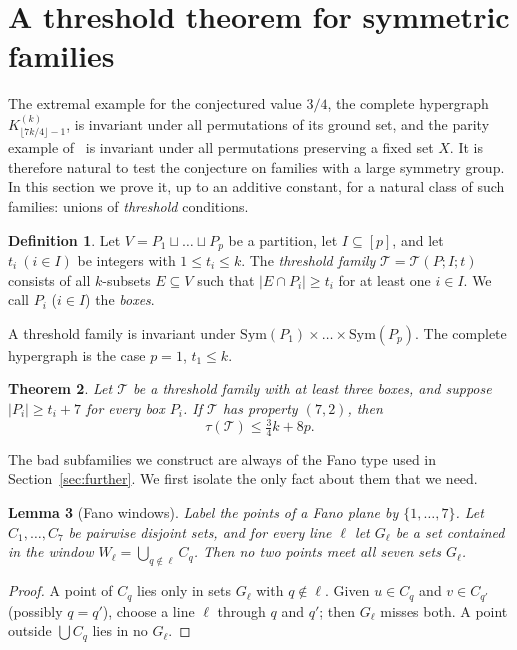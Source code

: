 \documentclass[11pt]{amsart}
\newtheorem{theorem}{Theorem}[section]
\newtheorem{lemma}[theorem]{Lemma}
\theoremstyle{definition}
\newtheorem{definition}[theorem]{Definition}
\theoremstyle{remark}
\begin{document}
\section{A threshold theorem for symmetric families}\label{sec:threshold}

The extremal example for the conjectured value $3/4$, the complete hypergraph $K^{(k)}_{\lfloor 7k/4\rfloor-1}$, is invariant under all permutations of its ground set, and the parity example of~\cite{FKW} is invariant under all permutations preserving a fixed set $X$. It is therefore natural to test the conjecture on families with a large symmetry group. In this section we prove it, up to an additive constant, for a natural class of such families: unions of \emph{threshold} conditions.

\begin{definition}\label{def:threshold}
Let $V=P_1\sqcup\dots\sqcup P_p$ be a partition, let $I\subseteq[p]$, and let $t_i\ (i\in I)$ be integers with $1\le t_i\le k$. The \emph{threshold family} $\mathcal T=\mathcal T(P;I;t)$ consists of all $k$-subsets $E\subseteq V$ such that $|E\cap P_i|\ge t_i$ for at least one $i\in I$. We call $P_i$ ($i\in I$) the \emph{boxes}.
\end{definition}

A threshold family is invariant under $\mathrm{Sym}(P_1)\times\dots\times\mathrm{Sym}(P_p)$. The complete hypergraph is the case $p=1$, $t_1\le k$.

\begin{theorem}\label{thm:threshold}
Let $\mathcal T$ be a threshold family with at least three boxes, and suppose $|P_i|\ge t_i+7$ for every box $P_i$. If $\mathcal T$ has property $(7,2)$, then
\[
\tau(\mathcal T)\le \tfrac34k+8p .
\]
\end{theorem}

The bad subfamilies we construct are always of the Fano type used in Section~\ref{sec:further}. We first isolate the only fact about them that we need.

\begin{lemma}[Fano windows]\label{lem:fanowindows}
Label the points of a Fano plane by $\{1,\dots,7\}$. Let $C_1,\dots,C_7$ be pairwise disjoint sets, and for every line $\ell$ let $G_\ell$ be a set contained in the \emph{window} $W_\ell=\bigcup_{q\notin\ell}C_q$. Then no two points meet all seven sets $G_\ell$.
\end{lemma}

\begin{proof}
A point of $C_q$ lies only in sets $G_\ell$ with $q\notin\ell$. Given $u\in C_q$ and $v\in C_{q'}$ (possibly $q=q'$), choose a line $\ell$ through $q$ and $q'$; then $G_\ell$ misses both. A point outside $\bigcup C_q$ lies in no $G_\ell$.
\end{proof}
\end{document}
